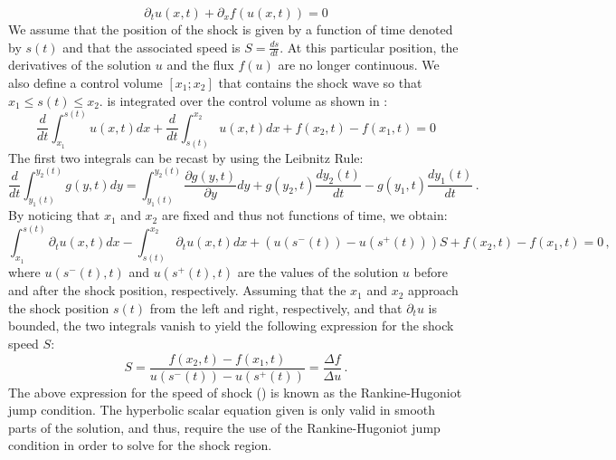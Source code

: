 %
\begin{equation}\label{eq:rh_sct1b}
\partial_t u(x,t) + \partial_x f(u(x,t)) = 0
\end{equation}
%
We assume that the position of the shock is given by a function of time denoted by $s(t)$ and that the associated speed is $S = \frac{ds}{dt}$. At this particular position, the derivatives of the solution $u$ and the flux $f(u)$ are no longer continuous. We also define a control volume $\left[ x_1; x_2 \right]$ that contains the shock wave so that $x_1 \leq s(t) \leq x_2$.  is integrated over the control volume as shown in :
%
\begin{equation}\label{eq:rh2_sct1b}
\frac{d}{dt} \int_{x_1}^{s(t)} u(x,t) dx + \frac{d}{dt} \int_{s(t)}^{x_2} u(x,t) dx + f(x_2,t) - f(x_1,t) = 0
\end{equation}
% 
The first two integrals can be recast by using the Leibnitz Rule:
%
\begin{equation}\label{eq:rh3_sct1b}
\frac{d}{dt} \int_{y_1(t)}^{y_2(t)} g(y,t) dy =  \int_{y_1(t)}^{y_2(t)} \frac{\partial g(y,t)}{\partial y} dy + g(y_2,t) \frac{d y_2(t)}{dt} - g(y_1,t) \frac{d y_1(t)}{dt} \,.
\end{equation}
% 
By noticing that $x_1$ and $x_2$ are fixed and thus not functions of time, we obtain:
%
\begin{equation}\label{eq:rh4_sct1b}
\int_{x_1}^{s(t)} \partial_t u(x,t) dx - \int_{s(t)}^{x_2} \partial_t u(x,t) dx + \left( u(s^-(t)) - u(s^+(t)) \right) S + f(x_2,t) - f(x_1,t) = 0 \,,
\end{equation}
%
where $u(s^-(t),t)$ and $u(s^+(t),t)$ are the values of the solution $u$ before and after the shock position, respectively. Assuming that the $x_1$ and $x_2$ approach the shock position $s(t)$ from the left and right, respectively, and that $\partial_t u$ is bounded, the two integrals vanish to yield the following expression for the shock speed  $S$:
%
\begin{equation}\label{eq:rh5_sct1b}
S = \frac{f(x_2,t) - f(x_1,t)}{u(s^-(t)) - u(s^+(t))} = \frac{\Delta f}{\Delta u} \,.
\end{equation}
%
The above expression for the speed of shock () is known as the Rankine-Hugoniot jump condition. The hyperbolic scalar equation given  is only valid in smooth parts of the solution, and thus, require the use of the Rankine-Hugoniot jump condition in order to solve for the shock region.   
%
